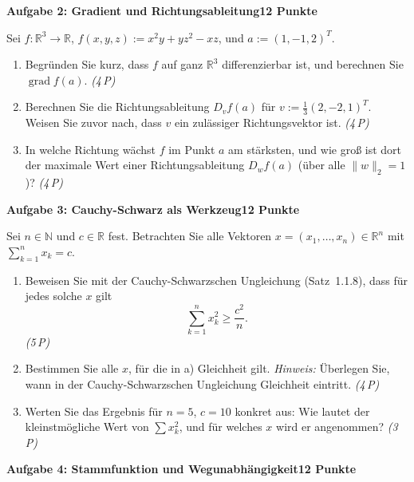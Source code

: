 \documentclass[a4paper,12pt]{article}
\newcommand{\pkt}[1]{\hfill\textit{(#1\,P)}}
\newcommand{\aufgabe}[3]{%
  \bigskip\par\noindent\textbf{Aufgabe #1: #2}\hfill\textbf{#3 Punkte}%
  \par\nobreak\medskip}
\begin{document}
\aufgabe{2}{Gradient und Richtungsableitung}{12}

Sei $f:\mathbb{R}^3\to\mathbb{R}$, $f(x,y,z):=x^2y+yz^2-xz$, und $a:=(1,-1,2)^{T}$.
\begin{enumerate}[label=\alph*)]
  \item Begründen Sie kurz, dass $f$ auf ganz $\mathbb{R}^3$ differenzierbar ist, und berechnen Sie $\operatorname{grad} f(a)$. \pkt{4}
  \item Berechnen Sie die Richtungsableitung $D_v f(a)$ für $v:=\tfrac13(2,-2,1)^{T}$. Weisen Sie zuvor nach, dass $v$ ein zulässiger Richtungsvektor ist. \pkt{4}
  \item In welche Richtung wächst $f$ im Punkt $a$ am stärksten, und wie groß ist dort der maximale Wert einer Richtungsableitung $D_w f(a)$ (über alle $\|w\|_2=1$)? \pkt{4}
\end{enumerate}

\aufgabe{3}{Cauchy-Schwarz als Werkzeug}{12}

Sei $n\in\mathbb{N}$ und $c\in\mathbb{R}$ fest. Betrachten Sie alle Vektoren
$x=(x_1,\dots,x_n)\in\mathbb{R}^n$ mit $\sum_{k=1}^n x_k = c$.
\begin{enumerate}[label=\alph*)]
  \item Beweisen Sie mit der Cauchy-Schwarzschen Ungleichung (Satz~1.1.8), dass für jedes solche $x$ gilt
  \[ \sum_{k=1}^n x_k^2 \ge \frac{c^2}{n}. \]
  \pkt{5}
  \item Bestimmen Sie alle $x$, für die in a) Gleichheit gilt. \emph{Hinweis:} Überlegen Sie, wann in der Cauchy-Schwarzschen Ungleichung Gleichheit eintritt. \pkt{4}
  \item Werten Sie das Ergebnis für $n=5$, $c=10$ konkret aus: Wie lautet der kleinstmögliche Wert von $\sum x_k^2$, und für welches $x$ wird er angenommen? \pkt{3}
\end{enumerate}

\aufgabe{4}{Stammfunktion und Wegunabhängigkeit}{12}
\end{document}
